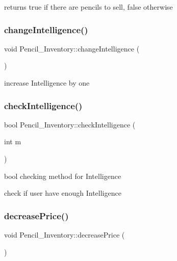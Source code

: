 returns true if there are pencils to sell, false otherwise 

\mbox{\label{classPencil__Inventory_ad636ed1ffea98dbf19169ebff6e765c6}} 
\subsubsection{\texorpdfstring{changeIntelligence()}{changeIntelligence()}}
{\footnotesize\ttfamily void Pencil\+\_\+\+Inventory\+::change\+Intelligence (\begin{DoxyParamCaption}{ }\end{DoxyParamCaption})}



increase Intelligence by one 

\mbox{\label{classPencil__Inventory_a8d786909be377e03da78532606f59880}} 
\subsubsection{\texorpdfstring{checkIntelligence()}{checkIntelligence()}}
{\footnotesize\ttfamily bool Pencil\+\_\+\+Inventory\+::check\+Intelligence (\begin{DoxyParamCaption}\item[{int}]{m }\end{DoxyParamCaption})}



bool checking method for Intelligence 

check if user have enough Intelligence \mbox{\label{classPencil__Inventory_a711d64e733cd5b67ea3aeb0ccdda0870}} 
\subsubsection{\texorpdfstring{decreasePrice()}{decreasePrice()}}
{\footnotesize\ttfamily void Pencil\+\_\+\+Inventory\+::decrease\+Price (\begin{DoxyParamCaption}{ }\end{DoxyParamCaption})}



